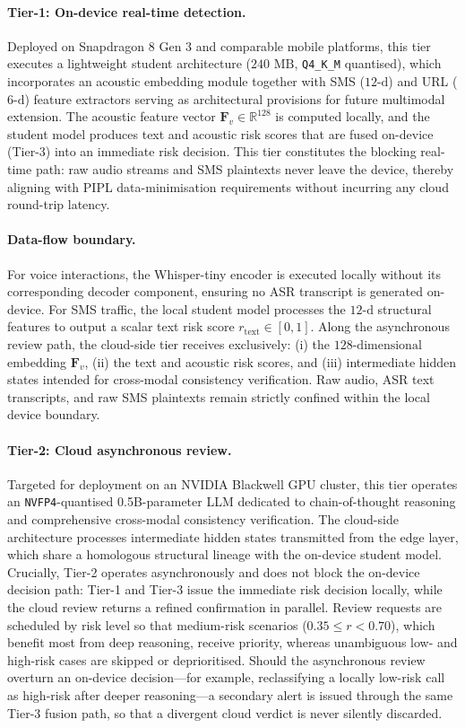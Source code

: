 \documentclass[a4paper,fleqn]{cas-sc}
\begin{document}
\paragraph{Tier-1: On-device real-time detection.}
Deployed on Snapdragon 8 Gen 3 and comparable mobile platforms, this tier executes a lightweight student architecture ($240\text{~MB}$, \texttt{Q4\_K\_M} quantised), which incorporates an acoustic embedding module together with SMS ($12\text{-d}$) and URL ($6\text{-d}$) feature extractors serving as architectural provisions for future multimodal extension. The acoustic feature vector $\bm{F}_v \in \mathbb{R}^{128}$ is computed locally, and the student model produces text and acoustic risk scores that are fused on-device (Tier-3) into an immediate risk decision. This tier constitutes the blocking real-time path: raw audio streams and SMS plaintexts never leave the device, thereby aligning with PIPL data-minimisation requirements without incurring any cloud round-trip latency.

\paragraph{Data-flow boundary.}
For voice interactions, the Whisper-tiny encoder is executed locally without its corresponding decoder component, ensuring no ASR transcript is generated on-device. For SMS traffic, the local student model processes the $12\text{-d}$ structural features to output a scalar text risk score $r_{\text{text}} \in [0,1]$. Along the asynchronous review path, the cloud-side tier receives exclusively: (i) the $128\text{-dimensional}$ embedding $\bm{F}_v$, (ii) the text and acoustic risk scores, and (iii) intermediate hidden states intended for cross-modal consistency verification. Raw audio, ASR text transcripts, and raw SMS plaintexts remain strictly confined within the local device boundary.

\paragraph{Tier-2: Cloud asynchronous review.}
Targeted for deployment on an NVIDIA Blackwell GPU cluster, this tier operates an \texttt{NVFP4}-quantised 0.5B-parameter LLM dedicated to chain-of-thought reasoning and comprehensive cross-modal consistency verification. The cloud-side architecture processes intermediate hidden states transmitted from the edge layer, which share a homologous structural lineage with the on-device student model. Crucially, Tier-2 operates asynchronously and does not block the on-device decision path: Tier-1 and Tier-3 issue the immediate risk decision locally, while the cloud review returns a refined confirmation in parallel. Review requests are scheduled by risk level so that medium-risk scenarios ($0.35 \le r < 0.70$), which benefit most from deep reasoning, receive priority, whereas unambiguous low- and high-risk cases are skipped or deprioritised. Should the asynchronous review overturn an on-device decision---for example, reclassifying a locally low-risk call as high-risk after deeper reasoning---a secondary alert is issued through the same Tier-3 fusion path, so that a divergent cloud verdict is never silently discarded.
\end{document}
